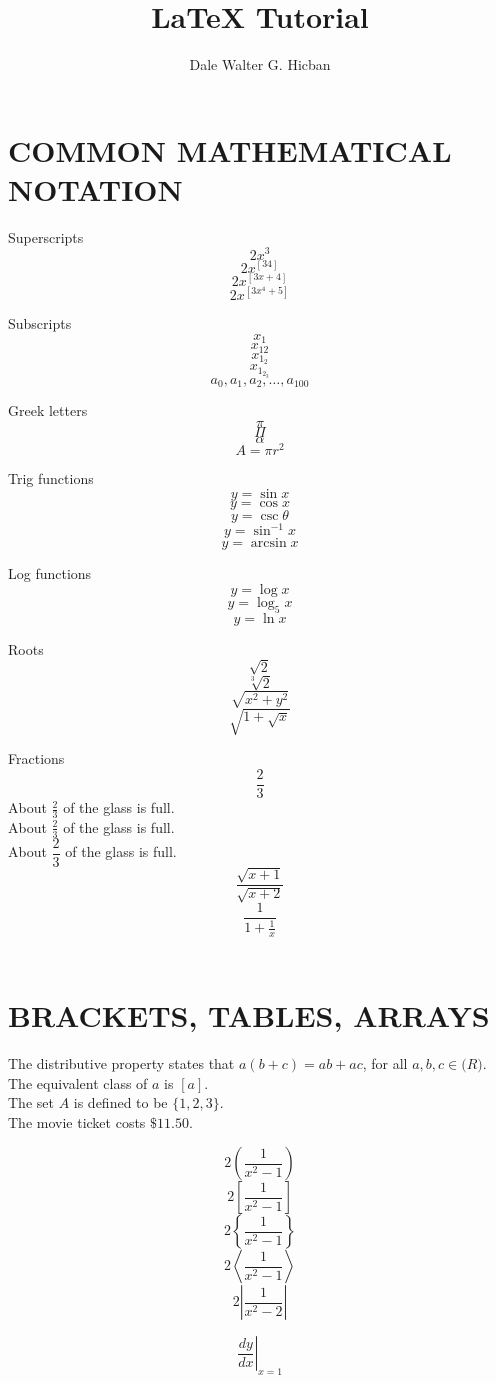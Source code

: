 \documentclass{article}
\title{LaTeX Tutorial}
\author{Dale Walter G. Hicban}
\begin{document}
\maketitle

\break

\section{COMMON MATHEMATICAL NOTATION}

Superscripts $$2x^3$$
$$2x^[34]$$
$$2x^[  3x+4  ]$$
$$2x^[  3x^4+5  ]$$

Subscripts
$$x_1$$
$$x_{12}$$
$$x_{1_2}$$
$$x_{  1_{2_3}  }$$
$$a_0, a_1, a_2, \ldots, a_{100}$$

Greek letters
$$\pi$$
$$\Pi$$
$$\alpha$$
$$A=\pi r^2$$

Trig functions
$$y=\sin x$$
$$y=\cos x$$
$$y=\csc \theta$$
$$y=\sin^{-1} x$$
$$y=\arcsin x$$

Log functions
$$y=\log x$$
$$y=\log_5 x$$
$$y=\ln x$$

Roots
$$\sqrt{2}$$
$$\sqrt[3]{2}$$
$$\sqrt{  x^2+y^2  }$$
$$\sqrt{ 1+\sqrt{x} }$$

Fractions
$$\frac{2}{3}$$
About $\frac{2}{3}$ of the glass is full.\\[6pt]
About $\displaystyle \frac{2}{3}$ of the glass is full.\\[6pt]
About $\dfrac{2}{3}$ of the glass is full.\\[6pt]

$$\frac{  \sqrt{x+1}  }{  \sqrt{x+2}  }$$
$$\frac{1}{  1+\frac{1}{x}  }$$\\[12pt]

\section{BRACKETS, TABLES, ARRAYS}
	The distributive property states that $a(b+c)=ab+ac$, for all $a, b, c \in \mathbb(R)$.\\[6pt]
	The equivalent class of $a$ is $[a]$.\\[6pt]
	The set $A$ is defined to be $\{1, 2, 3\}$.\\[6pt]
	The movie ticket costs $\$11.50$.

$$2\left(  \frac{1}{x^2-1}  \right)$$
$$2\left[  \frac{1}{x^2-1}  \right]$$
$$2\left\{  \frac{1}{x^2-1}  \right\}$$
$$2\left \langle \frac{1}{x^2-1}\right \rangle $$
$$2\left | \frac{1}{x^2-2}\right | $$

$$\left.\frac{dy}{dx}\right|_{x=1}$$
\end{document}

